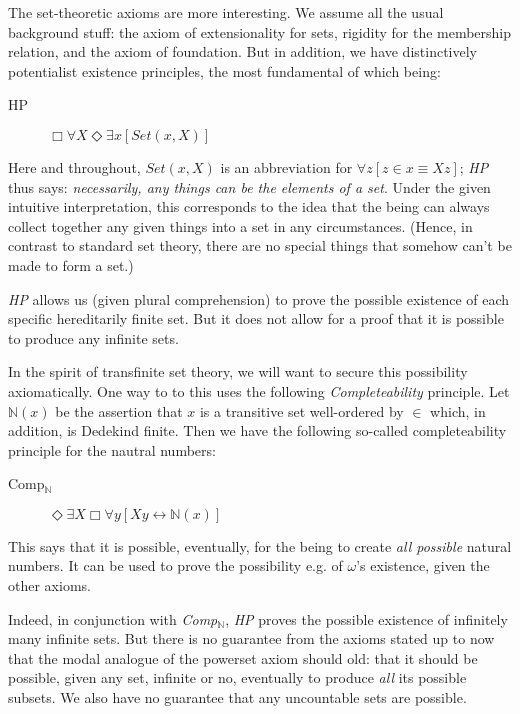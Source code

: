 \documentclass{article}
\begin{document}
The set-theoretic axioms are more interesting. We assume all the usual 
background stuff: the axiom of extensionality for sets, rigidity for the 
membership relation, and the axiom of foundation. But in addition, we have 
distinctively potentialist existence principles, the most fundamental of which 
being:

\begin{description} 
    \item[HP] $\Box \forall X \Diamond \exists x [Set(x, X)]$
\end{description}
Here and throughout, $Set(x, X)$ is an abbreviation for 
$\forall z[z \in x \equiv Xz]$; \emph{HP} thus says: \emph{necessarily, any 
things can be the elements of a set}. Under the given 
intuitive interpretation, this corresponds to the idea that the being 
can always collect together any given things into a set in any circumstances.  
(Hence, in contrast to standard set theory, there are no 
special things that somehow can't be made to form a set.)

\emph{HP} allows us (given plural comprehension) to prove the possible existence 
of each specific hereditarily finite set. But it does not allow for a proof that 
it is possible to produce any infinite sets. 

In the spirit of transfinite 
set theory, we will want to secure this possibility axiomatically. 
One way to to this uses the following \emph{Completeability} principle. 
Let $\mathbb{N}(x)$ be the assertion that $x$ is a transitive set well-ordered 
by $\in$ which, in addition, is Dedekind finite. Then we have the following 
so-called completeability principle for the nautral numbers:
\begin{description}
    \item[Comp$_\mathbb{N}$]
    $\Diamond \exists X \Box \forall y[ Xy \leftrightarrow \mathbb{N}(x)]$
\end{description}
This says that it is possible, eventually, for the being to create \emph{all possible}
natural numbers. It can be used to prove the possibility 
e.g. of $\omega$'s existence, given the other axioms.

Indeed, in conjunction with \emph{Comp$_\mathbb{N}$}, 
\emph{HP} proves the possible existence of infinitely many
infinite sets. But there is no guarantee from the axioms stated up to now that 
the modal analogue of the powerset axiom should old: that it should be possible, 
given any set, infinite or no, eventually to produce \emph{all} its possible subsets. 
We also have no guarantee that any uncountable sets are possible.
\end{document}

